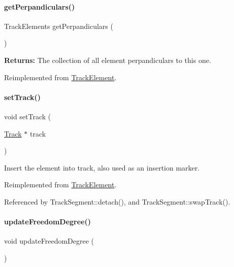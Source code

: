 \paragraph{\texorpdfstring{get\+Perpandiculars()}{getPerpandiculars()}}
{\footnotesize\ttfamily Track\+Elements get\+Perpandiculars (\begin{DoxyParamCaption}{ }\end{DoxyParamCaption})\hspace{0.3cm}{\ttfamily [virtual]}}

{\bfseries Returns\+:} The collection of all element perpandiculars to this one. 

Reimplemented from \mbox{\hyperlink{classKite_1_1TrackElement_aa0ba92ebf19f596537dc051c090d5736}{Track\+Element}}.

\mbox{\label{classKite_1_1TrackSegment_abd3d8093f871d3d1a7f24b053648026c}} 
\paragraph{\texorpdfstring{set\+Track()}{setTrack()}}
{\footnotesize\ttfamily void set\+Track (\begin{DoxyParamCaption}\item[{\mbox{\hyperlink{classKite_1_1Track}{Track}} $\ast$}]{track }\end{DoxyParamCaption})\hspace{0.3cm}{\ttfamily [virtual]}}

Insert the element into {\ttfamily track}, also used as an insertion marker. 

Reimplemented from \mbox{\hyperlink{classKite_1_1TrackElement_abd3d8093f871d3d1a7f24b053648026c}{Track\+Element}}.



Referenced by Track\+Segment\+::detach(), and Track\+Segment\+::swap\+Track().

\mbox{\label{classKite_1_1TrackSegment_af5332d647c0482aa90ad7cc9b2a50f3a}} 
\paragraph{\texorpdfstring{update\+Freedom\+Degree()}{updateFreedomDegree()}}
{\footnotesize\ttfamily void update\+Freedom\+Degree (\begin{DoxyParamCaption}{ }\end{DoxyParamCaption})\hspace{0.3cm}{\ttfamily [virtual]}}


